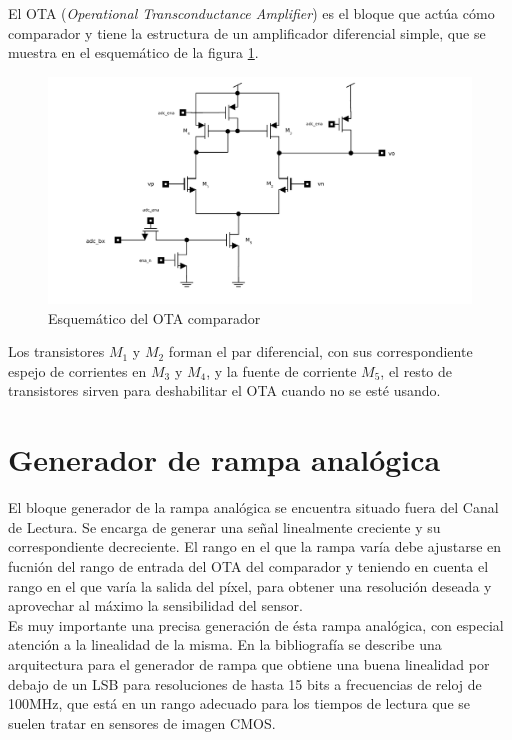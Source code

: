 El OTA (\textit{Operational Transconductance Amplifier}) es el bloque que actúa
cómo comparador y tiene la estructura de un amplificador diferencial simple, que
se muestra en el esquemático de la figura \ref{fig:ota_sch}.\\

\begin{figure}[h]
	\includegraphics[width=\textwidth]{svg/ota_sch.pdf}
	\caption{Esquemático del OTA comparador}
	\label{fig:ota_sch}
\end{figure}

Los transistores $M_1$ y $M_2$ forman el par diferencial, con sus correspondiente
espejo de corrientes en $M_3$ y $M_4$, y la fuente de corriente $M_5$, el resto de
transistores sirven para deshabilitar el OTA cuando no se esté usando.\\

\section{Generador de rampa analógica}\label{cap:ro_sch_armp}

El bloque generador de la rampa analógica se encuentra situado fuera del Canal de
Lectura. Se encarga de generar una señal linealmente creciente y su correspondiente
decreciente. El rango en el que la rampa varía debe ajustarse en fucnión del rango
de entrada del OTA del comparador y teniendo en cuenta el rango en el que varía
la salida del píxel, para obtener una resolución deseada y aprovechar al máximo
la sensibilidad del sensor.\\

Es muy importante una precisa generación de ésta rampa analógica, con especial
atención a la linealidad de la misma. En la bibliografía se describe una arquitectura
para el generador de rampa que obtiene una buena linealidad por debajo de un LSB
para resoluciones de hasta 15 bits a frecuencias de reloj de 100MHz\cite{Sordo-Ibanez2013},
que está en un rango adecuado para los tiempos de lectura que se suelen tratar en
sensores de imagen CMOS.\\

